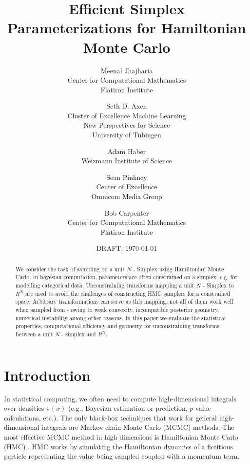 \documentclass[11pt]{article}
\begin{document}
\title{Efficient Simplex Parameterizations for Hamiltonian Monte Carlo}
\author{Meenal Jhajharia
        \\ \small Center for Computational Mathematics
        \\ \small Flatiron Institute
\and \large Seth D. Axen
     \\ \small Cluster of Excellence Machine Learning
     \\ \small New Perspectives for Science
     \\ \small University of T\"ubingen
\and Adam Haber
     \\ \small Weizmann Institute of Science
\and Sean Pinkney
     \\ \small Center of Excellence
     \\ \small Omnicom Media Group
\and Bob Carpenter
     \\ \small Center for Computational Mathematics
     \\ \small Flatiron Institute
}
\date{DRAFT: \today}
\maketitle

\begin{abstract}
  \noindent
  We consider the task of sampling on a unit $N$ - Simplex using Hamiltonian Monte Carlo. In bayesian computation, parameters are often constrained on a simplex, e.g. for modelling categorical data. Unconstraining transforms mapping a unit $N$ - Simplex to $R^N$ are used to avoid the challenges of constructing HMC samplers for a constrained space. Arbitrary transformations can serve as this mapping, not all of them work well when sampled from - owing to weak convexity, incompatible posterior geometry, numerical instability among other reasons. In this paper we evaluate the statistical properties,  computational efficiency and geometry for unconstraining transforms between a unit $N$ - simplex and $R^N$.
  
  \end{abstract}

\section{Introduction}

In statistical computing, we often need to compute high-dimensional integrals over densities $\pi(x)$ (e.g., Bayesian estimation or prediction, $p$-value calculations, etc.).  The only black-box techniques that work for general high-dimensional integrals are Markov chain Monte Carlo (MCMC) methods.  The most effective MCMC method in high dimensions is Hamiltonian Monte Carlo (HMC) \cite{neal2011mcmc}. HMC works by simulating the Hamiltonian dynamics of a fictitious particle representing the value being sampled coupled with a momentum term. 
\end{document}
